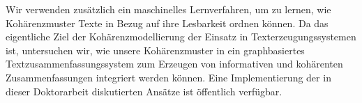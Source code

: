 Wir verwenden zusätzlich ein maschinelles Lernverfahren, um zu lernen, wie Kohärenzmuster Texte in Bezug auf ihre Lesbarkeit ordnen können. 
Da das eigentliche Ziel der Kohärenzmodellierung der Einsatz in Texterzeugungssystemen ist, untersuchen wir, wie unsere Kohärenzmuster
in ein graphbasiertes Textzusammenfassungssystem zum Erzeugen von informativen und kohärenten Zusammenfassungen integriert werden können.
Eine Implementierung der in dieser Doktorarbeit diskutierten Ansätze ist öffentlich verfügbar.




